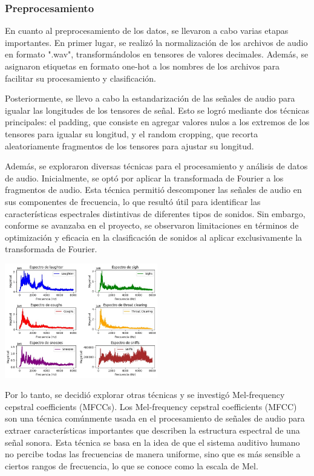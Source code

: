 \subsubsection{Preprocesamiento}

En cuanto al preprocesamiento de los datos, se llevaron a cabo varias etapas importantes. En primer lugar, se realizó la normalización de los archivos de audio en formato ".wav", transformándolos en tensores de valores decimales. Además, se asignaron etiquetas en formato one-hot a los nombres de los archivos para facilitar su procesamiento y clasificación.

Posteriormente, se llevo a cabo la estandarización de las señales de audio para igualar las longitudes de los tensores de señal. Esto se logró mediante dos técnicas principales: el padding, que consiste en agregar valores nulos a los extremos de los tensores para igualar su longitud, y el random cropping, que recorta aleatoriamente fragmentos de los tensores para ajustar su longitud.

Además, se exploraron diversas técnicas para el procesamiento y análisis de datos de audio. Inicialmente, se optó por aplicar la transformada de Fourier a los fragmentos de audio. Esta técnica permitió descomponer las señales de audio en sus componentes de frecuencia, lo que resultó útil para identificar las características espectrales distintivas de diferentes tipos de sonidos. Sin embargo, conforme se avanzaba en el proyecto, se observaron limitaciones en términos de optimización y eficacia en la clasificación de sonidos al aplicar exclusivamente la transformada de Fourier. 


\begin{center}
    \includegraphics[width=0.5\textwidth]{ImagenesLatex/fourier.jpg}
\end{center}


Por lo tanto, se decidió explorar otras técnicas y se investigó Mel-frequency cepstral coefficients (MFCCs).
Los Mel-frequency cepstral coefficients (MFCC) son una técnica comúnmente usada en el procesamiento de señales de audio para extraer características importantes que describen la estructura espectral de una señal sonora. Esta técnica se basa en la idea de que el sistema auditivo humano no percibe todas las frecuencias de manera uniforme, sino que es más sensible a ciertos rangos de frecuencia, lo que se conoce como la escala de Mel.


